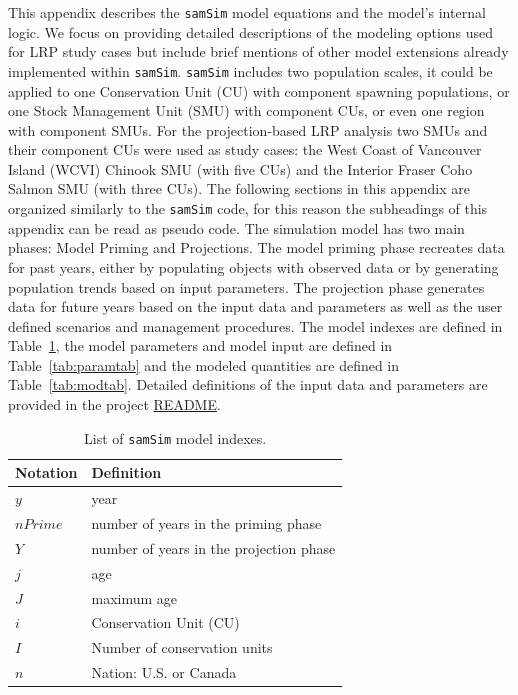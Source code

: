 \documentclass[11pt]{book}
\begin{document}
This appendix describes the \texttt{samSim} model equations and the model's internal logic. We focus on providing detailed descriptions of the modeling options used for LRP study cases but include brief mentions of other model extensions already implemented within \texttt{samSim}. \texttt{samSim} includes two population scales, it could be applied to one Conservation Unit (CU) with component spawning populations, or one Stock Management Unit (SMU) with component CUs, or even one region with component SMUs. For the projection-based LRP analysis two SMUs and their component CUs were used as study cases: the West Coast of Vancouver Island (WCVI) Chinook SMU (with five CUs) and the Interior Fraser Coho Salmon SMU (with three CUs). The following sections in this appendix are organized similarly to the \texttt{samSim} code, for this reason the subheadings of this appendix can be read as pseudo code. The simulation model has two main phases: Model Priming and Projections. The model priming phase recreates data for past years, either by populating objects with observed data or by generating population trends based on input parameters. The projection phase generates data for future years based on the input data and parameters as well as the user defined scenarios and management procedures. The model indexes are defined in Table~\ref{tab:indtab}, the model parameters and model input are defined in Table~\ref{tab:paramtab} and the modeled quantities are defined in Table~\ref{tab:modtab}. Detailed definitions of the input data and parameters are provided in the project \href{https://github.com/Pacific-salmon-assess/samSim/tree/LRP\#readme}{README}.
\begin{table}[ht]
\centering
\caption{List of \texttt{samSim} model indexes.}
\begin{tabular}{l l}
\hline
Notation & Definition \\ 
\hline
$y$ & year \\ 
$nPrime$ & number of years in the priming phase\\
$Y$ & number of years in the projection phase\\
$j$ & age \\
$J$ & maximum age \\
$i$ & Conservation Unit (CU)\\
$I$ & Number of conservation units\\
$n$ & Nation: U.S. or Canada \\
\hline
\end{tabular}
\label{tab:indtab}
\end{table}
\end{document}
